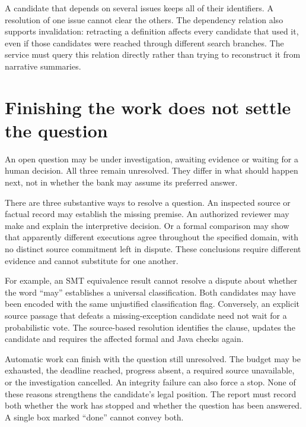 A candidate that depends on several issues keeps all of their identifiers. A
resolution of one issue cannot clear the others. The dependency relation also
supports invalidation: retracting a definition affects every candidate that used
it, even if those candidates were reached through different search branches.
The service must query this relation directly rather than trying to reconstruct
it from narrative summaries.

\section{Finishing the work does not settle the question}
\label{merge:M06:07}


An open question may be under investigation, awaiting evidence or waiting for a
human decision. All three remain unresolved. They differ in what should happen
next, not in whether the bank may assume its preferred answer.

There are three substantive ways to resolve a question. An inspected source or
factual record may establish the missing premise. An authorized reviewer may
make and explain the interpretive decision. Or a formal comparison may show that
apparently different executions agree throughout the specified domain, with no
distinct source commitment left in dispute. These conclusions require different
evidence and cannot substitute for one another.

For example, an SMT equivalence result cannot resolve a dispute about whether the
word ``may'' establishes a universal classification. Both candidates may have
been encoded with the same unjustified classification flag. Conversely, an
explicit source passage that defeats a missing-exception candidate need not wait
for a probabilistic vote. The source-based resolution identifies the clause,
updates the candidate and requires the affected formal and Java checks again.


Automatic work can finish with the question still unresolved. The budget may be
exhausted, the deadline reached, progress absent, a required source unavailable,
or the investigation cancelled. An integrity failure can also force a stop.
None of these reasons strengthens the candidate's legal position. The report
must record both whether the work has stopped and whether the question has been
answered. A single box marked ``done'' cannot convey both.

